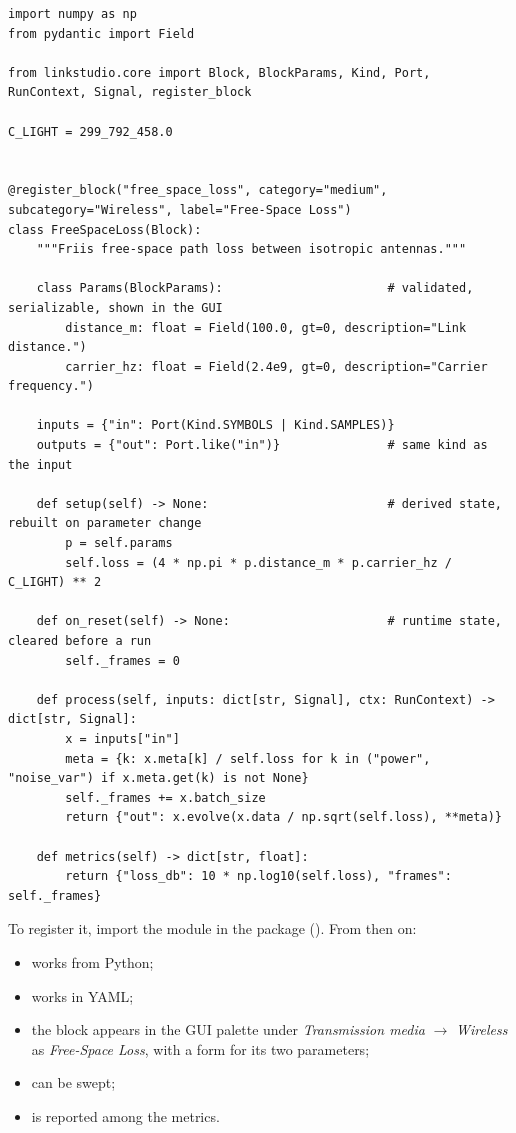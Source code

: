 \begin{lstlisting}[style=py,caption={A new block, e.g. in \file{linkstudio/phy/channel/pathloss.py}.},label=lst:example-block]
import numpy as np
from pydantic import Field

from linkstudio.core import Block, BlockParams, Kind, Port, RunContext, Signal, register_block

C_LIGHT = 299_792_458.0


@register_block("free_space_loss", category="medium", subcategory="Wireless", label="Free-Space Loss")
class FreeSpaceLoss(Block):
    """Friis free-space path loss between isotropic antennas."""

    class Params(BlockParams):                       # validated, serializable, shown in the GUI
        distance_m: float = Field(100.0, gt=0, description="Link distance.")
        carrier_hz: float = Field(2.4e9, gt=0, description="Carrier frequency.")

    inputs = {"in": Port(Kind.SYMBOLS | Kind.SAMPLES)}
    outputs = {"out": Port.like("in")}               # same kind as the input

    def setup(self) -> None:                         # derived state, rebuilt on parameter change
        p = self.params
        self.loss = (4 * np.pi * p.distance_m * p.carrier_hz / C_LIGHT) ** 2

    def on_reset(self) -> None:                      # runtime state, cleared before a run
        self._frames = 0

    def process(self, inputs: dict[str, Signal], ctx: RunContext) -> dict[str, Signal]:
        x = inputs["in"]
        meta = {k: x.meta[k] / self.loss for k in ("power", "noise_var") if x.meta.get(k) is not None}
        self._frames += x.batch_size
        return {"out": x.evolve(x.data / np.sqrt(self.loss), **meta)}

    def metrics(self) -> dict[str, float]:
        return {"loss_db": 10 * np.log10(self.loss), "frames": self._frames}
\end{lstlisting}

To register it, import the module in the package 
(). From then on:
\begin{itemize}
  \item {} works from Python;
  \item {} works in YAML;
  \item the block appears in the GUI palette under \emph{Transmission media} $\to$ \emph{Wireless} as \emph{Free-Space Loss}, with a form for its two
  parameters;
  \item {} can be swept;
  \item {} is reported among the metrics.
\end{itemize}

